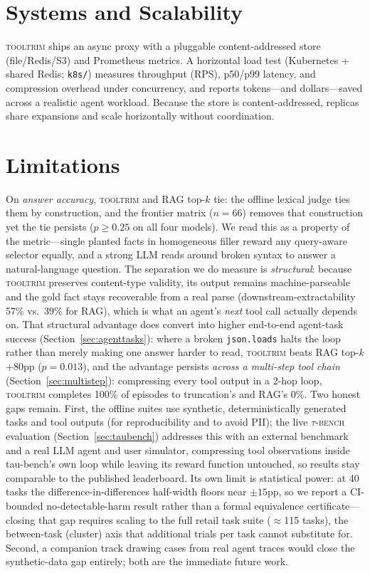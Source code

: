 \documentclass[11pt]{article}
\newcommand{\tooltrim}{\textsc{tooltrim}}
\begin{document}
\section{Systems and Scalability}
\tooltrim{} ships an async proxy with a pluggable content-addressed store
(file/Redis/S3) and Prometheus metrics. A horizontal load test (Kubernetes +
shared Redis; \texttt{k8s/}) measures throughput (RPS), p50/p99 latency, and
compression overhead under concurrency, and reports tokens---and dollars---saved
across a realistic agent workload. Because the store is content-addressed,
replicas share expansions and scale horizontally without coordination.

\section{Limitations}
On \emph{answer accuracy}, \tooltrim{} and RAG top-$k$ tie: the offline lexical
judge ties them by construction, and the frontier matrix ($n{=}66$) removes that
construction yet the tie persists ($p\geq 0.25$ on all four models). We read this as a
property of the metric---single planted facts in homogeneous filler reward any
query-aware selector equally, and a strong LLM reads around broken syntax to
answer a natural-language question. The separation we do measure is
\emph{structural}: because \tooltrim{} preserves content-type validity, its output
remains machine-parseable and the gold fact stays recoverable from a real parse
(downstream-extractability 57\% vs.\ 39\% for RAG), which is what an agent's
\emph{next} tool call actually depends on. That structural advantage does convert
into higher end-to-end agent-task success (Section~\ref{sec:agenttasks}): where a
broken \texttt{json.loads} halts the loop rather than merely making one answer
harder to read, \tooltrim{} beats RAG top-$k$ $+80$pp ($p{=}0.013$), and the
advantage persists \emph{across a multi-step tool chain}
(Section~\ref{sec:multistep}): compressing every tool output in a 2-hop loop,
\tooltrim{} completes 100\% of episodes to truncation's and RAG's 0\%. Two honest
gaps remain. First, the offline suites use synthetic, deterministically generated
tasks and tool outputs (for reproducibility and to avoid PII); the live
\textsc{$\tau$-bench} evaluation (Section~\ref{sec:taubench}) addresses this with
an external benchmark and a real LLM agent and user simulator, compressing tool
observations inside tau-bench's own loop while leaving its reward function
untouched, so results stay comparable to the published leaderboard. Its own limit
is statistical power: at 40 tasks the difference-in-differences half-width floors
near $\pm15$pp, so we report a CI-bounded no-detectable-harm result rather than a
formal equivalence certificate---closing that gap requires scaling to the full
retail task suite ($\approx$115 tasks), the between-task (cluster) axis that
additional trials per task cannot substitute for. Second, a companion track
drawing cases from real agent traces would close the synthetic-data gap entirely;
both are the immediate future work.
\end{document}
